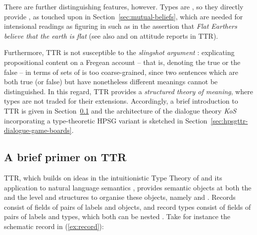 \documentclass[output=paper
	        ,collection
	        ,collectionchapter
 	        ,biblatex
                ,babelshorthands
                ,newtxmath
                ,draftmode
                ,colorlinks, citecolor=brown
]{langscibook}
\begin{document}
There are further distinguishing features, however.
%
Types are , so they directly provide , as touched upon in Section~\ref{sec:mutual-beliefs}, which are needed for intensional readings as figuring in  such as in the assertion that \textit{Flat Earthers believe that the earth is flat} (see also \citealt{Cooper:2005:b} and \citealt{Cooper:ms} on attitude reports in TTR).


Furthermore, TTR is not susceptible to the \emph{slingshot argument}  \citep[--26]{Barwise:Perry:1983}: explicating propositional content on a Fregean account \citep{Frege:1892} -- that is, denoting the true or the false -- in terms of sets of  is too coarse-grained, since two sentences which are both true (or false) but have nonetheless different meanings cannot be distinguished.
%
In this regard, TTR provides a \emph{structured theory of meaning},  where types are not traded for their extensions.
%
Accordingly, a brief introduction to TTR is given in Section~\ref{sec:brief-primer-ttr} and the architecture of the dialogue theory \emph{KoS} incorporating a type-theoretic HPSG variant is sketched in Section~\ref{sec:hpsgttr-dialogue-game-boards}.
  




  
\subsection{A brief primer on TTR}
\label{sec:brief-primer-ttr}

TTR, which builds on ideas in the intuitionistic Type Theory of \citet{Martin-Loef:1984} and its application to natural language semantics \citep[see][]{Ranta:2015}, provides semantic objects at both the  and the  level and structures to organise these objects, namely  and  %
\citetext{see \citealp{Cooper:2005:a}, \citealp{Cooper:2005:b}, \citealp{Cooper:2012}, \citealp{Cooper:2017:a}, and \citealp{Cooper:Ginzburg:2015} for expositions}. 
%
Records consist of fields of pairs of labels and objects, and record types consist of fields of pairs of labels and types, which both can be nested \citep{Cooper:ms}.
%
%
Take for instance the schematic record in (\ref{ex:record}):
%
\ea \label{ex:record}
\avm{
[$l_0$ & = [$l_1$ & = $o_1$ \\
			$l_2$ & = $o_2$] \\
$l_3$ & = $o_3$]
}
\z
\end{document}
